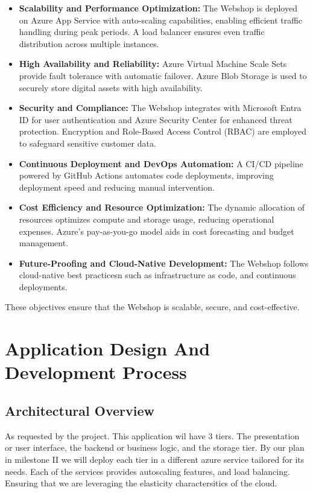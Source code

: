 \documentclass{llncs}
\begin{document}
\begin{itemize}
    \item \textbf{Scalability and Performance Optimization:}
          The Webshop is deployed on Azure App Service with auto-scaling capabilities, enabling efficient traffic handling during peak periods. A load balancer ensures even traffic distribution across multiple instances.
          \bigskip %
    \item \textbf{High Availability and Reliability:}
          Azure Virtual Machine Scale Sets provide fault tolerance with automatic failover. Azure Blob Storage is used to securely store digital assets with high availability.
          \bigskip %
    \item \textbf{Security and Compliance:}
          The Webshop integrates with Microsoft Entra ID for user authentication and Azure Security Center for enhanced threat protection. Encryption and Role-Based Access Control (RBAC) are employed to safeguard sensitive customer data.
          \bigskip %
    \item \textbf{Continuous Deployment and DevOps Automation:}
          A CI/CD pipeline powered by GitHub Actions automates code deployments, improving deployment speed and reducing manual intervention.
          \bigskip %
    \item \textbf{Cost Efficiency and Resource Optimization:}
          The dynamic allocation of resources optimizes compute and storage usage, reducing operational expenses. Azure’s pay-as-you-go model aids in cost forecasting and budget management.
          \bigskip %
    \item \textbf{Future-Proofing and Cloud-Native Development:}
          The Webshop follows cloud-native best practicesn such as infrastructure as code, and continuous deployments.
\end{itemize}

These objectives ensure that the Webshop is scalable, secure, and cost-effective.
\section{Application Design And Development Process}
\subsection{Architectural Overview}
As requested by the project. This application wil have 3 tiers. The presentation or user interface, the backend or business logic, and the storage tier.
By our plan in milestone II we will deploy each tier in a different azure service tailored for its needs.
Each of the services provides autoscaling features, and load balancing. Ensuring that we are leveraging the elasticity charactersitics of the cloud.
\end{document}
